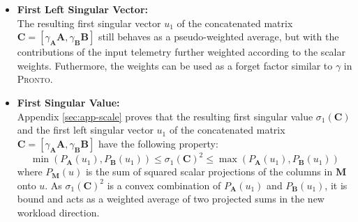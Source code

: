 \begin{itemize}
    \item \textbf{First Left Singular Vector:}\\
        The resulting first singular vector $u_1$ of the concatenated matrix $\mathbf{C} =
        [\gamma_{\mathbf{A}}\mathbf{A},
        \gamma_{\mathbf{\mathbf{B}}}\mathbf{\mathbf{B}}]$ still behaves as a
        pseudo-weighted average, but with the contributions of the input telemetry
        further weighted according to the scalar weights. Futhermore, the
        weights can be used as a forget factor similar to $\gamma$ in
        \textsc{Pronto}.
    \item \textbf{First Singular Value:}\\
        Appendix \ref{sec:app-scale} proves that the resulting first
        singular value $\sigma_1(\mathbf{C})$ and the first left singular vector
        $u_1$ of the concatenated matrix $\mathbf{C} =
        [\gamma_{\mathbf{A}}\mathbf{A}, \gamma_{\mathbf{B}}\mathbf{B}]$ have the
        following property:
        \[ \min(P_{\mathbf{A}}(u_1),P_{\mathbf{B}}(u_1))
        \leq \sigma_1(\mathbf{C})^2 \leq
        \max(P_{\mathbf{A}}(u_1),P_{\mathbf{B}}(u_1)) \]
        where $P_{\mathbf{M}}(u)$ is the sum of squared scalar projections of
        the columns in $\mathbf{M}$ onto $u$. As $\sigma_1(\mathbf{C})^2$ is a
        convex combination of $P_{\mathbf{A}}(u_1)$ and $P_{\mathbf{B}}(u_1)$,
        it is bound and acts as a weighted average of two projected sums in the
        new workload direction.
\end{itemize}

